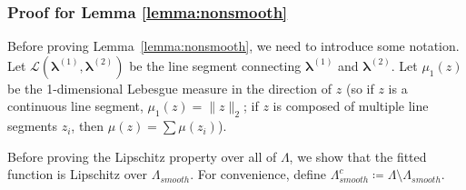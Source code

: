 \documentclass[10pt]{book}
\theoremstyle{definition}
\begin{document}
\subsubsection{Proof for Lemma \ref{lemma:nonsmooth}}

Before proving Lemma~\ref{lemma:nonsmooth}, we need to introduce some notation.
Let $\mathcal{L}(\boldsymbol{\lambda}^{(1)},\boldsymbol{\lambda}^{(2)})$
be the line segment connecting $\boldsymbol{\lambda}^{(1)}$ and $\boldsymbol{\lambda}^{(2)}$.
Let $\mu_{1}(z)$ be the 1-dimensional Lebesgue measure in the direction
of $z$ (so if $z$ is a continuous line segment, $\mu_{1}(z)=\|z\|_{2}$;
if $z$ is composed of multiple line segments $z_{i}$, then $\mu(z)=\sum\mu(z_{i})$).

Before proving the Lipschitz property over all of $\Lambda$, we show that the fitted function is Lipschitz over $\Lambda_{smooth}$.
For convenience, define $\Lambda_{smooth}^{c} \coloneqq \Lambda \setminus \Lambda_{smooth}$.
\end{document}
